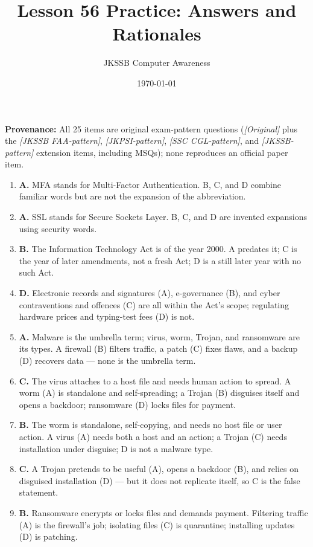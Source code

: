\documentclass[11pt]{article}
\title{Lesson 56 Practice: Answers and Rationales}
\author{JKSSB Computer Awareness}
\date{\today}
\begin{document}
\maketitle
\noindent\textbf{Provenance:} All 25 items are original exam-pattern questions (\textit{[Original]} plus the \textit{[JKSSB FAA-pattern]}, \textit{[JKPSI-pattern]}, \textit{[SSC CGL-pattern]}, and \textit{[JKSSB-pattern]} extension items, including MSQs); none reproduces an official paper item.
\begin{enumerate}[label=\textbf{Q\arabic*.}, leftmargin=*]
\item \textbf{A.} MFA stands for Multi-Factor Authentication. B, C, and D
  combine familiar words but are not the expansion of the abbreviation.
\item \textbf{A.} SSL stands for Secure Sockets Layer. B, C, and D are
  invented expansions using security words.
\item \textbf{B.} The Information Technology Act is of the year 2000. A
  predates it; C is the year of later amendments, not a fresh Act; D is a
  still later year with no such Act.
\item \textbf{D.} Electronic records and signatures (A), e-governance (B),
  and cyber contraventions and offences (C) are all within the Act's scope;
  regulating hardware prices and typing-test fees (D) is not.
\item \textbf{A.} Malware is the umbrella term; virus, worm, Trojan, and
  ransomware are its types. A firewall (B) filters traffic, a patch (C)
  fixes flaws, and a backup (D) recovers data --- none is the umbrella term.
\item \textbf{C.} The virus attaches to a host file and needs human action
  to spread. A worm (A) is standalone and self-spreading; a Trojan (B)
  disguises itself and opens a backdoor; ransomware (D) locks files for
  payment.
\item \textbf{B.} The worm is standalone, self-copying, and needs no host
  file or user action. A virus (A) needs both a host and an action; a
  Trojan (C) needs installation under disguise; D is not a malware type.
\item \textbf{C.} A Trojan pretends to be useful (A), opens a backdoor
  (B), and relies on disguised installation (D) --- but it does not
  replicate itself, so C is the false statement.
\item \textbf{B.} Ransomware encrypts or locks files and demands payment.
  Filtering traffic (A) is the firewall's job; isolating files (C) is
  quarantine; installing updates (D) is patching.

\end{enumerate}
\end{document}
